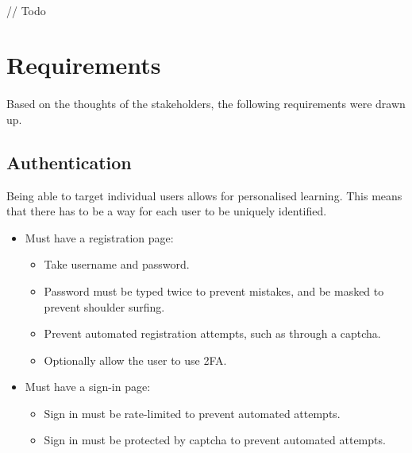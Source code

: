 \documentclass{report}
\begin{document}
\paragraph{}
// Todo

\section{Requirements}
\paragraph{}
Based on the thoughts of the stakeholders, the following requirements were drawn up.

\subsection{Authentication}
Being able to target individual users allows for personalised learning. This means that there has to be a way for each user to be uniquely identified.
\begin{itemize}
  \item Must have a registration page:
  \begin{itemize}
    \item Take username and password.
    \item Password must be typed twice to prevent mistakes, and be masked to prevent shoulder surfing.
    \item Prevent automated registration attempts, such as through a captcha.
    \item Optionally allow the user to use 2FA.
  \end{itemize}
  \item Must have a sign-in page:
  \begin{itemize}
    \item Sign in must be rate-limited to prevent automated attempts.
    \item Sign in must be protected by captcha to prevent automated attempts.
  \end{itemize}
\end{itemize}
\end{document}
